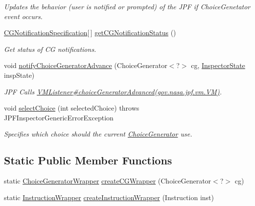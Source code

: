 \begin{DoxyCompactItemize}
\begin{DoxyCompactList}\small\item\em Updates the behavior (user is notified or prompted) of the J\+PF if Choice\+Genetator event occurs. \end{DoxyCompactList}\item 
\hyperlink{classgov_1_1nasa_1_1jpf_1_1inspector_1_1interfaces_1_1_choice_generators_interface_1_1_c_g_notification_specification}{C\+G\+Notification\+Specification}\mbox{[}$\,$\mbox{]} \hyperlink{classgov_1_1nasa_1_1jpf_1_1inspector_1_1server_1_1choicegenerators_1_1_choice_generators_manager_ac71dc9a4e54fd24d2391b0a44cec330a}{get\+C\+G\+Notification\+Status} ()
\begin{DoxyCompactList}\small\item\em Get status of CG notifications. \end{DoxyCompactList}\item 
void \hyperlink{classgov_1_1nasa_1_1jpf_1_1inspector_1_1server_1_1choicegenerators_1_1_choice_generators_manager_a86e3ebd46655f4356b9b81287bf53600}{notify\+Choice\+Generator\+Advance} (Choice\+Generator$<$?$>$ cg, \hyperlink{interfacegov_1_1nasa_1_1jpf_1_1inspector_1_1server_1_1expression_1_1_inspector_state}{Inspector\+State} insp\+State)
\begin{DoxyCompactList}\small\item\em J\+PF Calls \hyperlink{}{V\+M\+Listener\#choice\+Generator\+Advanced(gov.\+nasa.\+jpf.\+vm.\+V\+M)}. \end{DoxyCompactList}\item 
void \hyperlink{classgov_1_1nasa_1_1jpf_1_1inspector_1_1server_1_1choicegenerators_1_1_choice_generators_manager_aec648a136b7b6dbccc233a72b7549090}{select\+Choice} (int selected\+Choice)  throws J\+P\+F\+Inspector\+Generic\+Error\+Exception 
\begin{DoxyCompactList}\small\item\em Specifies which choice should the current \hyperlink{}{Choice\+Generator} use. \end{DoxyCompactList}\end{DoxyCompactItemize}
\subsection*{Static Public Member Functions}
\begin{DoxyCompactItemize}
\item 
static \hyperlink{classgov_1_1nasa_1_1jpf_1_1inspector_1_1utils_1_1_choice_generator_wrapper}{Choice\+Generator\+Wrapper} \hyperlink{classgov_1_1nasa_1_1jpf_1_1inspector_1_1server_1_1choicegenerators_1_1_choice_generators_manager_a047e58523db0f6b69c29dc2638e7fe13}{create\+C\+G\+Wrapper} (Choice\+Generator$<$?$>$ cg)
\item 
static \hyperlink{classgov_1_1nasa_1_1jpf_1_1inspector_1_1utils_1_1_instruction_wrapper}{Instruction\+Wrapper} \hyperlink{classgov_1_1nasa_1_1jpf_1_1inspector_1_1server_1_1choicegenerators_1_1_choice_generators_manager_affa9e08d4d9943ebca9e72e1faa15dbd}{create\+Instruction\+Wrapper} (Instruction inst)
\end{DoxyCompactItemize}
